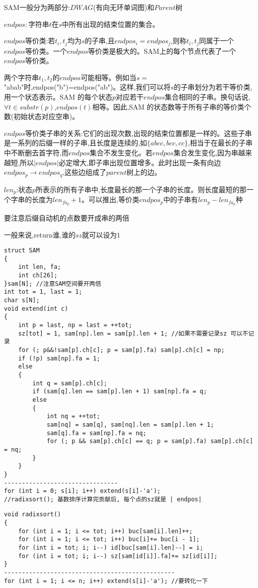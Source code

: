 \documentclass[a4paper,fontset=none]{ctexart}
\begin{document}
SAM一般分为两部分:$DWAG$(有向无环单词图)和$Parent$树

$endpos:$字符串$t$在$s$中所有出现的结束位置的集合。

$endpos$等价类:若$t_i,t_j$均为$s$的子串,且$endpos_i=endpos_j$,则称$t_i,t_j$同属于一个$endpos$等价类。一个$endpos$等价类是极大的。SAM上的每个节点代表了一个$endpos$等价类。

两个字符串$t_1,t_2$的$endpos$可能相等。例如当$s=$"abab"时,endpos("b")=endpos("ab")。这样,我们可以将$s$的子串划分为若干等价类,用一个状态表示。SAM 的每个状态$p$对应若干$endpos$集合相同的子串。换句话说,$∀t∈substr(p)$,$endpos(t)$相等。因此,SAM 的状态数等于所有子串的等价类个数(初始状态对应空串)。

$endpos$等价类子串的关系:它们的出现次数,出现的结束位置都是一样的。这些子串是一系列的后缀一样的子串,且长度是连续的,如$\{abcc,bcc,cc\}$,相当于在最长的子串中不断删去首字符,而$endpos$集合不发生变化。若$endpos$集合发生变化,因为串越来越短,所以$|endpos|$必定增大,即子串出现位置增多。此时出现一条有向边$endpos_p\rightarrow endpos_q$,这些边组成了$parent$树上的边。

$len_p$:状态$p$所表示的所有子串中,长度最长的那一个子串的长度。则长度最短的那一个字串的长度为$len_{fa_p}+1$。可以推出,等价类$endpos_p$中的子串有$len_p-len_{fa_p}$种

要注意后缀自动机的点数要开成串的两倍

一般来说,return谁,谁的$sz$就可以设为$1$

\begin{verbatim}
struct SAM
{
    int len, fa;
    int ch[26];
}sam[N]; //注意SAM空间要开两倍
int tot = 1, last = 1;
char s[N];
void extend(int c)
{
    int p = last, np = last = ++tot;
    sz[tot] = 1, sam[np].len = sam[p].len + 1; //如果不需要记录sz 可以不记录
    for (; p&&!sam[p].ch[c]; p = sam[p].fa) sam[p].ch[c] = np;
    if (!p) sam[np].fa = 1;
    else
    {
        int q = sam[p].ch[c];
        if (sam[q].len == sam[p].len + 1) sam[np].fa = q;
        else
        {
            int nq = ++tot;
            sam[nq] = sam[q], sam[nq].len = sam[p].len + 1;
            sam[q].fa = sam[np].fa = nq;
            for (; p && sam[p].ch[c] == q; p = sam[p].fa) sam[p].ch[c] = nq;
        }
    }
}
--------------------------------
for (int i = 0; s[i]; i++) extend(s[i]-'a');
//radixsort(); 基数排序计算完贡献后, 每个点的sz就是 | endpos|
\end{verbatim}

\begin{verbatim}
void radixsort()
{
    for (int i = 1; i <= tot; i++) buc[sam[i].len]++;
    for (int i = 1; i <= tot; i++) buc[i]+= buc[i - 1];
    for (int i = tot; i; i--) id[buc[sam[i].len]--] = i;
    for (int i = tot; i; i--) sz[sam[id[i]].fa]+= sz[id[i]];
}
------------------------------------------------
for (int i = 1; i <= n; i++) extend(s[i]-'a'); //要转化一下
\end{verbatim}
\end{document}
